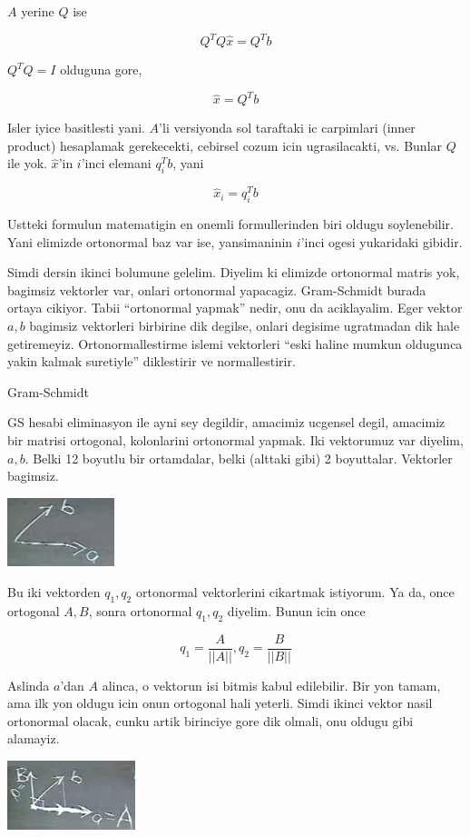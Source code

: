 \documentclass[12pt,fleqn]{article}\usepackage{../common}
\begin{document}
$A$ yerine $Q$ ise

\[ Q^TQ\hat{x} = Q^Tb \]

$Q^TQ = I$ olduguna gore, 

\[ \hat{x} = Q^Tb \]

Isler iyice basitlesti yani. $A$'li versiyonda sol taraftaki ic carpimlari
(inner product) hesaplamak gerekecekti, cebirsel cozum icin ugrasilacakti,
vs. Bunlar $Q$ ile yok. $\hat{x}$'in $i$'inci elemani $q_i^Tb$, yani 

\[ \hat{x}_i = q_i^Tb \]

Ustteki formulun matematigin en onemli formullerinden biri oldugu
soylenebilir. Yani elimizde ortonormal baz var ise, yansimaninin $i$'inci
ogesi yukaridaki gibidir. 

Simdi dersin ikinci bolumune gelelim. Diyelim ki elimizde ortonormal matris
yok, bagimsiz vektorler var, onlari ortonormal yapacagiz. Gram-Schmidt
burada ortaya cikiyor. Tabii ``ortonormal yapmak'' nedir, onu da
aciklayalim. Eger vektor $a,b$ bagimsiz vektorleri birbirine dik degilse,
onlari degisime ugratmadan dik hale getiremeyiz. Ortonormallestirme islemi
vektorleri ``eski haline mumkun oldugunca yakin kalmak suretiyle''
diklestirir ve normallestirir. 

Gram-Schmidt

GS hesabi eliminasyon ile ayni sey degildir, amacimiz ucgensel degil,
amacimiz bir matrisi ortogonal, kolonlarini ortonormal yapmak. Iki
vektorumuz var diyelim, $a,b$. Belki 12 boyutlu bir ortamdalar, belki
(alttaki gibi) 2 boyuttalar. Vektorler bagimsiz. 

\includegraphics[height=2cm]{17_1.png}

Bu iki vektorden $q_1,q_2$ ortonormal vektorlerini cikartmak istiyorum. Ya
da, once ortogonal $A,B$, sonra ortonormal $q_1,q_2$ diyelim. Bunun icin once

\[ q_1 = \frac{ A}{||A||}, q_2 = \frac{ B}{||B||}  \]

Aslinda $a$'dan $A$ alinca, o vektorun isi bitmis kabul edilebilir. Bir yon
tamam, ama ilk yon oldugu icin onun ortogonal hali yeterli. Simdi ikinci
vektor nasil ortonormal olacak, cunku artik birinciye gore dik olmali, onu
oldugu gibi alamayiz. 

\includegraphics[height=2cm]{17_2.png}
\end{document}
